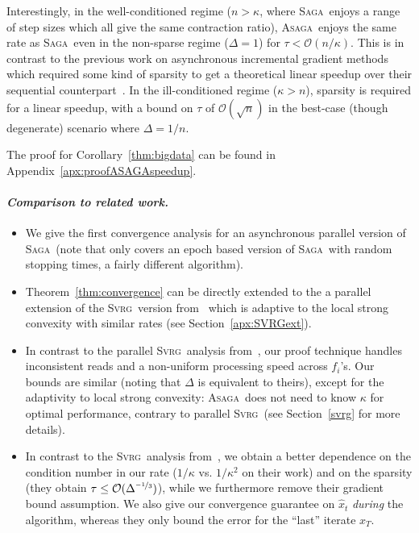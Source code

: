 \documentclass[twoside, 11pt]{article}
\newcommand{\overlap}{\tau}
\newcommand{\sparsity}{\Delta}
\newcommand{\ASAGA}{\textsc{Asaga}}
\newcommand{\SAGA}{\textsc{Saga}}
\newcommand{\SVRG}{\textsc{Svrg}}
\begin{document}
Interestingly, in the well-conditioned regime ($n > \kappa$, where \SAGA\ enjoys a range of step sizes which all give the same contraction ratio), \ASAGA\ enjoys the same rate as \SAGA\ even in the non-sparse regime ($\sparsity = 1$) for $\overlap < \mathcal{O}(n/\kappa)$. This is in contrast to the previous work on asynchronous incremental gradient methods which required some kind of sparsity to get a theoretical linear speedup over their sequential counterpart~\citep{hogwild,mania}.
In the ill-conditioned regime ($\kappa > n$), sparsity is required for a linear speedup, with a bound on $\overlap$ of $\mathcal{O}(\sqrt{n})$ in the best-case (though degenerate) scenario where $\sparsity = 1/n$.

The proof for Corollary~\ref{thm:bigdata} can be found in Appendix~\ref{apx:proofASAGAspeedup}.

\paragraph{\textit{Comparison to related work.}}
\begin{itemize}[topsep=1mm, itemsep=-1mm]
\item We give the first convergence analysis for an asynchronous parallel version of \SAGA\ (note that \citet{smola} only covers an epoch based version of \SAGA\ with random stopping times, a fairly different algorithm).
\item Theorem~\ref{thm:convergence} can be directly extended to the a parallel extension of the \SVRG\ version from~\citet{qsaga} which is adaptive to the local strong convexity with similar rates (see Section~\ref{apx:SVRGext}).
\item In contrast to the parallel \SVRG\ analysis from~\citet[Thm. 2]{smola}, our proof technique handles inconsistent reads and a non-uniform processing speed across $f_i$'s.
Our bounds are similar (noting that $\sparsity$ is equivalent to theirs), except for the adaptivity to local strong convexity: \ASAGA\ does not need to know $\kappa$ for optimal performance, contrary to parallel \SVRG\ (see Section~\ref{svrg} for more details).
\item In contrast to the \SVRG\ analysis from~\citet[Thm. 14]{mania}, we obtain a better dependence on the condition number in our rate ($1/\kappa$ vs. $1/\kappa^2$ on their work) and on the sparsity (they obtain $\overlap \leq \mathcal{O}(\sparsity^{\nicefrac{-1}{3}})$), while we furthermore remove their gradient bound assumption.
We also give our convergence guarantee on $\hat{x}_t$ \emph{during} the algorithm, whereas they only bound the error for the ``last'' iterate $x_T$.
\end{itemize}
\end{document}

